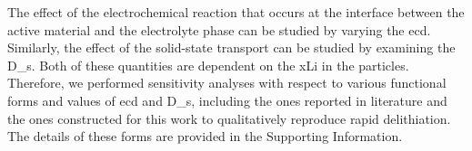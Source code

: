 \documentclass{article}
\begin{document}
The effect of the electrochemical reaction that occurs at the
interface between the active material and the electrolyte phase can be
studied by varying the \gls{ecd}. Similarly, the effect
of the solid-state transport can be studied by examining the
\gls{D_s}. Both of these quantities are dependent on the
\gls{xLi} in the particles. Therefore, we performed sensitivity
analyses with respect to various functional forms and values of
\gls{ecd} and \gls{D_s}, including the ones reported in
literature\cite{chueh2021,amin2015,moshtev1984,newman1993,newman1994-2,newman1995-2,newman1996,mukherjee2017,chiang2020,tsai2018,dees2008}
and the ones constructed for this work to qualitatively reproduce
rapid delithiation. The details of these forms are provided in the
Supporting Information.
\end{document}
